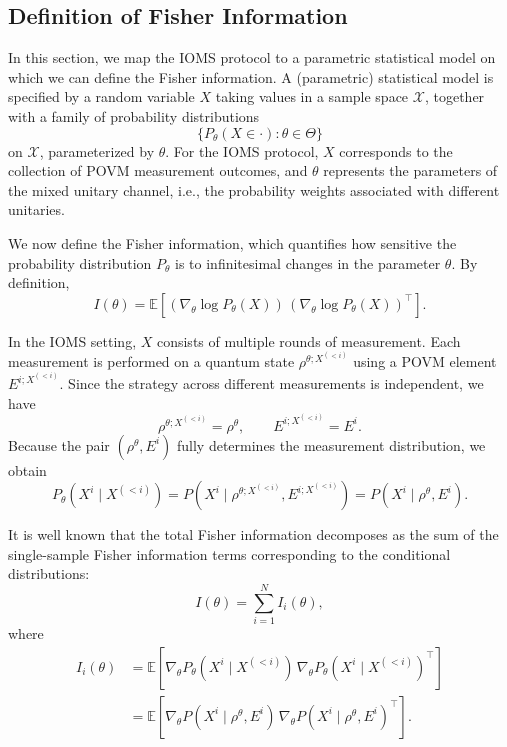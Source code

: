 \documentclass[12pt]{article}
\begin{document}
\subsection{Definition of Fisher Information}

In this section, we map the IOMS protocol to a parametric statistical model on which we can define the Fisher information. A (parametric) statistical model is specified by a random variable $X$ taking values in a sample space $\mathcal{X}$, together with a family of probability distributions
\begin{equation}
    \{ P_\theta(X \in \cdot) : \theta \in \Theta \}
\end{equation}
on $\mathcal{X}$, parameterized by $\theta$.  
For the IOMS protocol, $X$ corresponds to the collection of POVM measurement outcomes, and $\theta$ represents the parameters of the mixed unitary channel, i.e., the probability weights associated with different unitaries.

We now define the Fisher information, which quantifies how sensitive the probability distribution $P_\theta$ is to infinitesimal changes in the parameter $\theta$. By definition,
\begin{equation}\label{eq:FImat-def}
    I(\theta) = \mathbb{E}\!\left[
        (\nabla_\theta \log P_\theta(X)) \, (\nabla_\theta \log P_\theta(X))^\top
    \right].
\end{equation}

In the IOMS setting, $X$ consists of multiple rounds of measurement. Each measurement is performed on a quantum state $\rho^{\theta; X^{(<i)}}$ using a POVM element $E^{i; X^{(<i)}}$.  
Since the strategy across different measurements is independent, we have
\begin{equation}
    \rho^{\theta; X^{(<i)}} = \rho^{\theta}, 
    \qquad 
    E^{i; X^{(<i)}} = E^{i}.
\end{equation}
Because the pair $(\rho^{\theta}, E^{i})$ fully determines the measurement distribution, we obtain
\begin{equation}
    P_\theta(X^{i} \mid X^{(<i)}) 
    = P(X^{i} \mid \rho^{\theta; X^{(<i)}}, E^{i; X^{(<i)}})
    = P(X^{i} \mid \rho^{\theta}, E^{i}).
\end{equation}

It is well known that the total Fisher information decomposes as the sum of the single-sample Fisher information terms corresponding to the conditional distributions:
\begin{equation}
    I(\theta) = \sum_{i=1}^{N} I_i(\theta),
\end{equation}
where
\begin{equation}\label{eq:FI}
\begin{split}
    I_i(\theta)
    &= \mathbb{E}\!\left[
        \nabla_\theta P_\theta(X^{i} \mid X^{(<i)}) \,
        \nabla_\theta P_\theta(X^{i} \mid X^{(<i)})^\top
    \right] \\
    &= \mathbb{E}\!\left[
        \nabla_\theta P(X^{i} \mid \rho^{\theta}, E^{i}) \,
        \nabla_\theta P(X^{i} \mid \rho^{\theta}, E^{i})^\top
    \right].
\end{split}
\end{equation}
\end{document}
